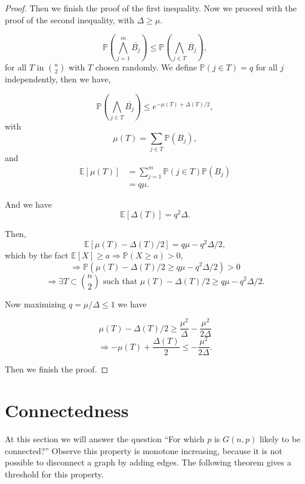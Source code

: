 \documentclass[12pt,twoside,a4paper,bibliography=totocnumbered]{book}
\numberwithin{equation}{section}
\theoremstyle{remark}
\begin{document}
\begin{proof}
Then we finish the proof of the first inequality. Now we proceed with the proof of the second inequality, with $\Delta \geq \mu$.

$$\mathbb{P}(\bigwedge_{j=1}^m \overline{B_j}) \leq \mathbb{P}(\bigwedge_{j \in T} \overline{B_j}),$$
for all $T$ in $\binom{n}{2}$ with $T$ chosen randomly. We define $\mathbb{P}(j \in T) = q$ for all $j$ independently, then we have,

$$ \mathbb{P}(\bigwedge_{j \in T} \overline{B_j}) \leq e^{- \mu(T) + \Delta(T)/2},$$
with
 $$\mu(T) = \sum_{j \in T} \mathbb{P}(B_j),$$
 and
 \begin{align*}
 \mathbb{E} [\mu(T)] &= \sum^m_{j=1} \mathbb{P}(j\in T) \mathbb{P} (B_j)\\
& = q\mu .
 \end{align*}

And we have
 $$ \mathbb{E}[\Delta(T)] = q^2\Delta.$$
 
 Then,
 $$\mathbb{E}[\mu(T) - \Delta(T)/2] = q\mu - q^2 \Delta/2,$$
 which by the fact $\mathbb{E}[X] \geq a \Rightarrow \mathbb{P}(X\geq a) > 0$,
 $$\Rightarrow \mathbb{P}(\mu(T) - \Delta(T)/2 \geq q\mu - q^2 \Delta / 2) > 0$$
 $$\Rightarrow \exists T \subset \binom{n}{2}\text{ such that } \mu(T) - \Delta(T)/2 \geq q\mu - q^2 \Delta / 2 .$$
 
Now maximizing $q = \mu / \Delta \leq 1$ we have

 $$ \mu(T) - \Delta(T)/2 \geq \frac{\mu^2}{\Delta} - \frac{\mu^2}{2\Delta}$$
 $$\Rightarrow -\mu(T) + \frac{\Delta(T)}{2} \leq -\frac{\mu^2}{2\Delta}.$$
 
 Then we finish the proof.
 
\end{proof}

\section{Connectedness}
At this section we will answer the question ``For which $p$ is $G(n,p)$ likely to be connected?'' Observe this property is monotone increasing, because it is not possible to disconnect a graph by adding edges. The following theorem gives a threshold for this property.
\end{document}
